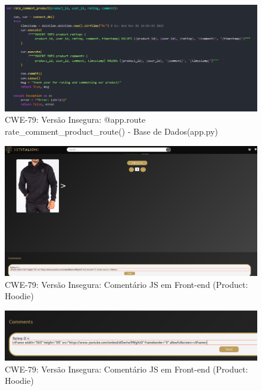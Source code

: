 \begin{figure}[H]
  \centering
  \includegraphics[width=16cm]{images/CWE79-rateProduct.png}
  \caption{CWE-79: Versão Insegura: @app.route rate\_comment\_product\_route() - Base de Dados(app.py)}
  \label{fig:cwe79-rateProduct}
\end{figure}

\begin{figure}[H]
  \centering
  \includegraphics[width=16cm]{images/CWE-79-1.png}
  \caption{CWE-79: Versão Insegura: Comentário JS em Front-end (Product: Hoodie)}
  \label{fig:cwe79-JS1}
\end{figure}

\begin{figure}[H]
  \centering
  \includegraphics[width=16cm]{images/CWE-79-3.png}
  \caption{CWE-79: Versão Insegura: Comentário JS em Front-end (Product: Hoodie)}
  \label{fig:cwe79-JS3}
\end{figure}

